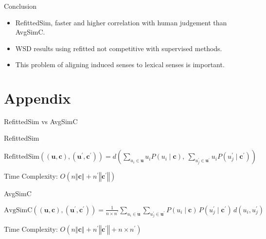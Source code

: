 \documentclass[dvipsnames]{beamer}
\newcommand{\fitcolumn}[1]{
	\begin{column}{0.5\textwidth}
		\begin{adjustbox}{max width=\columnwidth}
			#1
		\end{adjustbox}
	\end{column}%
}
\newcommand{\inputcolumn}[1]{%
	\fitcolumn{}
}
\newcommand{\fitmath}[1]{
	\begin{adjustbox}{max width = \textwidth}	
		$\displaystyle
		#1
		$
	\end{adjustbox}
}
\renewcommand{\c}{\mathbf{c}}
\renewcommand{\u}{\mathbf{u}}
\begin{document}
\begin{frame}{Conclusion}
			\begin{itemize}
				\item \alert{RefittedSim}, faster and higher correlation with human judgement than \alert{AvgSimC}. 
				
				\item \alert{WSD} results using refitted \alert{not competitive} with supervised methods.
				
				\item This problem of aligning \alert{induced} senses to \alert{lexical} senses is important.
			\end{itemize}			
		
		
\end{frame}



\section{Appendix}

\begin{frame}{RefittedSim vs AvgSimC}
	\vspace{-1em}
	\vfill
	\begin{block}{RefittedSim}
		\fitmath{
			\mathrm{RefittedSim}((\u,\c),(\u^{\prime},\c^{\prime}))
			= d\left(
			\sum_{u_{i}\in\u}u_{i}P(u_{i}\mid\c),\:
			\sum_{u_{j}^{\prime}\in\u^{\prime}}u_{i}P(u_{j}^{\prime}\mid\c^{\prime})\right)
		}
		
		\vspace{0.2em}
		Time Complexity: 
		$O(n\left\Vert \c\right\Vert +n^{\prime}\left\Vert \c^{\prime}\right\Vert)$
	\end{block}
	\vfill
	
	\begin{block}{AvgSimC}
		\fitmath{
			\mathrm{AvgSimC}((\u,\c),(\u^{\prime},\c^{\prime})) 
			=  \frac{1}{n \times n^{\prime}}
			\sum_{u_{i}\in\u}
			\sum_{u_{j}^{\prime}\in\u^{\prime}}
			P(u_{i}\mid\c)\,P(u_{j}^{\prime}\mid\c^{\prime})\,d(u_{i},u_{j}^{\prime})
		}
		
		\vspace{0.2em}
		Time Complexity: $O(n\left\Vert \c\right\Vert +n^{\prime}\left\Vert \c^{\prime}\right\Vert +n\times n^{\prime})$
	\end{block}
\end{frame}
\end{document}
